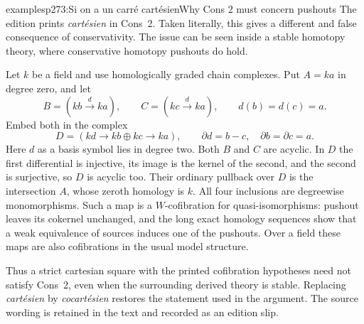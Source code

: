 \begin{dcomment}{examples}{p273:Si on a un carré cartésien}{Why Cons 2 must concern pushouts}
The edition prints \emph{cartésien} in Cons~2. Taken literally, this gives a different and false consequence of conservativity. The issue can be seen inside a stable homotopy theory, where conservative homotopy pushouts do hold.

Let $k$ be a field and use homologically graded chain complexes. Put $A=ka$ in degree zero, and let
\[
 B=(kb\xrightarrow{d}ka),\qquad
 C=(kc\xrightarrow{d}ka),\qquad d(b)=d(c)=a.
\]
Embed both in the complex
\[
 D=(kd\longrightarrow kb\oplus kc\longrightarrow ka),
 \qquad \partial d=b-c,\quad \partial b=\partial c=a.
\]
Here $d$ as a basis symbol lies in degree two. Both $B$ and $C$ are acyclic. In $D$ the first differential is injective, its image is the kernel of the second, and the second is surjective, so $D$ is acyclic too. Their ordinary pullback over $D$ is the intersection $A$, whose zeroth homology is $k$. All four inclusions are degreewise monomorphisms. Such a map is a $W$-cofibration for quasi-isomorphisms: pushout leaves its cokernel unchanged, and the long exact homology sequences show that a weak equivalence of sources induces one of the pushouts. Over a field these maps are also cofibrations in the usual model structure.

Thus a strict cartesian square with the printed cofibration hypotheses need not satisfy Cons~2, even when the surrounding derived theory is stable. Replacing \emph{cartésien} by \emph{cocartésien} restores the statement used in the argument. The source wording is retained in the text and recorded as an edition slip.
\end{dcomment}

